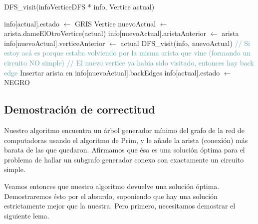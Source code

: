\begin{algorithm}[H]
\begin{algorithmic}[1]
\caption{DFS\_visit(infoVerticeDFS * info, Vertice actual)}
\STATE info[actual].estado $\leftarrow$ GRIS
    \STATE Vertice nuevoActual $\leftarrow$ arista.dameElOtroVertice(actual)
        \STATE info[nuevoActual].aristaAnterior $\leftarrow$ arista
        \STATE info[nuevoActual].verticeAnterior $\leftarrow$ actual
        \STATE DFS\_visit(info, nuevoActual)
            \STATE \textcolor{CadetBlue}{// Si estoy acá es porque estaba volviendo por la misma arista que vine (formando un circuito NO simple)}
        \ELSE
            \STATE \textcolor{CadetBlue}{// El nuevo vertice ya habia sido visitado, entonces hay back edge}
            \STATE Insertar arista en info[nuevoActual].backEdges
        \ENDIF
    \ENDIF
\ENDFOR
\STATE info[actual].estado $\leftarrow$ NEGRO
\end{algorithmic}
\end{algorithm}

\subsection{Demostración de correctitud}

Nuestro algoritmo encuentra un árbol generador mínimo del grafo de la red de computadoras usando el algoritmo de Prim, y le añade la arista (conexión) más barata de las que quedaron. Afirmamos que ésa es una solución óptima para el problema de hallar un subgrafo generador conexo con exactamente un circuito simple.

Veamos entonces que nuestro algoritmo devuelve una solución óptima. Demostraremos ésto por el absurdo, suponiendo que hay una solución estrictamente mejor que la nuestra. Pero primero, necesitamos demostrar el siguiente lema.

